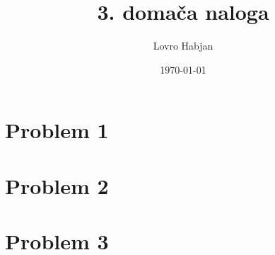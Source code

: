 \documentclass{article}
\title{3. domača naloga}
\author{Lovro Habjan}
\date{\today}
\begin{document}
\maketitle

\section{Problem 1}

\section{Problem 2}

\section{Problem 3}
\end{document}
